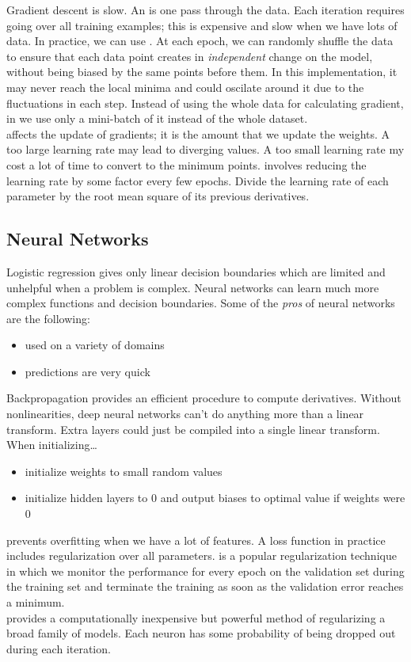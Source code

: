\documentclass{article}
\begin{document}
Gradient descent is slow. An  is one pass through the data. Each iteration requires going over all training examples; this is expensive and slow when we have lots of data. In practice, we can use . At each epoch, we can randomly shuffle the data to ensure that each data point creates in \emph{independent} change on the model, without being biased by the same points before them. In this implementation, it may never reach the local minima and could oscilate around it due to the fluctuations in each step. Instead of using the whole data for calculating gradient, in  we use only a mini-batch of it instead of the whole dataset. \\ 

 affects the update of gradients; it is the amount that we update the weights. A too large learning rate may lead to diverging values. A too small learning rate my cost a lot of time to convert to the minimum points.  involves reducing the learning rate by some factor every few epochs. Divide the learning rate of each parameter by the root mean square of its previous derivatives. \\ 

\subsection{Neural Networks}

Logistic regression gives only linear decision boundaries which are limited and unhelpful when a problem is complex. Neural networks can learn much more complex functions and  decision boundaries. Some of the \emph{pros} of neural networks are the following:
\begin{itemize}
  \item used on a variety of domains 
  \item predictions are very quick
\end{itemize}
Backpropagation provides an efficient procedure to compute derivatives. Without nonlinearities, deep neural networks can't do anything more than a linear transform. Extra layers could just be compiled into a single linear transform. \\ 

When initializing\dots 
\begin{itemize}
  \item initialize weights to small random values 
  \item initialize hidden layers to 0 and output biases to optimal value if weights were 0 
\end{itemize}
 prevents overfitting when we have a lot of features. A loss function in practice includes regularization over all parameters.  is a popular regularization technique in which we monitor the performance for every epoch on the validation set during the training set and terminate the training as soon as the validation error reaches a minimum. \\ 

 provides a computationally inexpensive but powerful method of regularizing a broad family of models. Each neuron has some probability of being dropped out during each iteration. 
\end{document}

